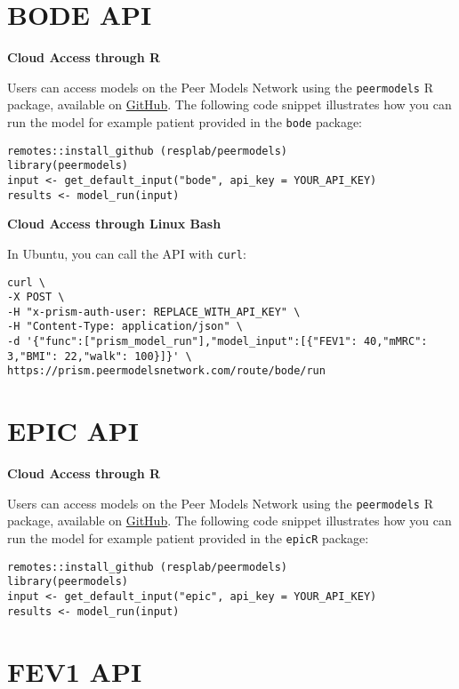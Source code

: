\documentclass[
]{book}
\begin{document}
\hypertarget{bode-api}{%
\section{BODE API}\label{bode-api}}

\textbf{Cloud Access through R}

Users can access models on the Peer Models Network using the \texttt{peermodels} R package, available on \href{https://github.com/resplab/peermodels}{GitHub}. The following code snippet illustrates how you can run the model for example patient provided in the \texttt{bode} package:

\begin{verbatim}
remotes::install_github (resplab/peermodels)
library(peermodels)
input <- get_default_input("bode", api_key = YOUR_API_KEY)
results <- model_run(input)
\end{verbatim}

\textbf{Cloud Access through Linux Bash}

In Ubuntu, you can call the API with \texttt{curl}:

\begin{verbatim}
curl \
-X POST \
-H "x-prism-auth-user: REPLACE_WITH_API_KEY" \
-H "Content-Type: application/json" \
-d '{"func":["prism_model_run"],"model_input":[{"FEV1": 40,"mMRC": 3,"BMI": 22,"walk": 100}]}' \
https://prism.peermodelsnetwork.com/route/bode/run
\end{verbatim}

\hypertarget{epic-api}{%
\section{EPIC API}\label{epic-api}}

\textbf{Cloud Access through R}

Users can access models on the Peer Models Network using the \texttt{peermodels} R package, available on \href{https://github.com/resplab/peermodels}{GitHub}. The following code snippet illustrates how you can run the model for example patient provided in the \texttt{epicR} package:

\begin{verbatim}
remotes::install_github (resplab/peermodels)
library(peermodels)
input <- get_default_input("epic", api_key = YOUR_API_KEY)
results <- model_run(input)
\end{verbatim}

\hypertarget{fev1-api}{%
\section{FEV1 API}\label{fev1-api}}
\end{document}
